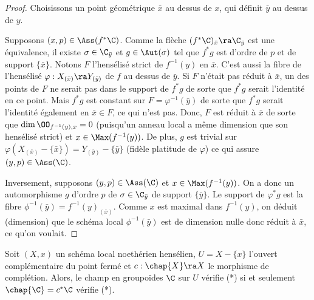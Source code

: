 \documentclass[10pt]{../fichiers-configuration-latex/smfart}
\begin{document}
\begin{proof} Choisissons un point géométrique $\bar x$ au dessus de $x$, qui définit $\bar y$ au
dessus de $y$.

Supposons $(x,p)\in\Ass(f^*\C)$.  Comme la flèche $(f^*\C)_{\bar x}\ra\C_{\bar y}$ est une
équivalence, il existe $\sigma\in \C_{\bar y}$ et $g\in\Aut(\sigma)$ tel que $f^*g$ est
d'ordre de $p$ et de  support $\{\bar x\}$. Notons $F$ l'hensélisé strict de $f^{-1}(y)$ en $\bar
x$. C'est aussi la fibre de l'hensélisé $\varphi: X_{(\bar x)}\ra Y_{(\bar y)}$ de $f$ au dessus de
$\bar y$. Si $F$ n'était pas réduit à $\bar x$, un des points de $F$ ne serait pas dans le support
de $f^*g$ de sorte que $f^*g$ serait l'identité en ce point. Mais $f^*g$ est constant sur
$F=\varphi^{-1}(\bar y)$ de sorte que $f^*g$ serait l'identité également en $\bar x\in F$, ce qui
n'est pas. Donc, $F$ est réduit à $\bar x$ de sorte que $\dim \OO_{f^{-1}(y),x}=0$ (puisqu'un anneau
local a même dimension que son hensélisé strict) et $x\in\Max(f^{-1}(y))$. De plus, $g$ est trivial
sur $\varphi(X_{(\bar x)}-\{\bar x\})=Y_{(\bar y)}-\{\bar y\}$ (fidèle platitude de $\varphi$) ce
qui assure $(y,p)\in\Ass(\C)$.


Inversement, supposons  $(y,p)\in\Ass(\C)$ et $x\in\Max(f^{-1}(y))$. On a donc un automorphisme $g$
d'ordre $p$ de $\sigma\in\C_{\bar y}$ de support $\{\bar y\}$. Le support de $\varphi^*g$ est la
fibre $\phi^{-1}(\bar y)=f^{-1}(y)_{(\bar x)}$. Comme $x$ est maximal dans $f^{-1}(y)$, on déduit
(dimension) que le schéma local $\phi^{-1}(\bar y)$ est de dimension nulle donc réduit à $\bar x$,
ce qu'on voulait.  \end{proof}


\begin{corollaire2}\label{20corass-comp} Soit $(X,x)$ un schéma local noethérien hensélien,
$U=X-\{x\}$ l'ouvert complémentaire du point fermé et $c:\chap{X}\ra X$ le morphisme de complétion.
Alors, le champ en groupoïdes $\C$ sur $U$ vérifie (*) si et seulement $\chap{\C}=c^*\C$ vérifie
(*).\end{corollaire2}
\end{document}

